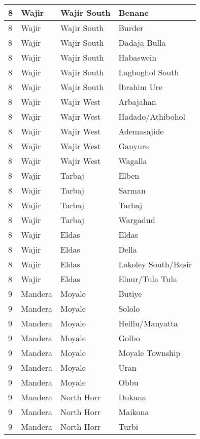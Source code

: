 \begin{table}[!ht]
\begin{tabular}{|l|l|l|l|}
        8 & Wajir & Wajir South & Benane \\ \hline
        8 & Wajir & Wajir South & Burder \\ \hline
        8 & Wajir & Wajir South & Dadaja Bulla \\ \hline
        8 & Wajir & Wajir South & Habaswein \\ \hline
        8 & Wajir & Wajir South & Lagboghol South \\ \hline
        8 & Wajir & Wajir South & Ibrahim Ure \\ \hline
        8 & Wajir & Wajir West & Arbajahan \\ \hline
        8 & Wajir & Wajir West & Hadado/Athibohol \\ \hline
        8 & Wajir & Wajir West & Ademasajide \\ \hline
        8 & Wajir & Wajir West & Ganyure \\ \hline
        8 & Wajir & Wajir West & Wagalla \\ \hline
        8 & Wajir & Tarbaj & Elben \\ \hline
        8 & Wajir & Tarbaj & Sarman \\ \hline
        8 & Wajir & Tarbaj & Tarbaj \\ \hline
        8 & Wajir & Tarbaj & Wargadud \\ \hline
        8 & Wajir & Eldas & Eldas \\ \hline
        8 & Wajir & Eldas & Della \\ \hline
        8 & Wajir & Eldas & Lakoley South/Basir \\ \hline
        8 & Wajir & Eldas & Elnur/Tula Tula \\ \hline
        9 & Mandera & Moyale & Butiye \\ \hline
        9 & Mandera & Moyale & Sololo \\ \hline
        9 & Mandera & Moyale & Heillu/Manyatta \\ \hline
        9 & Mandera & Moyale & Golbo \\ \hline
        9 & Mandera & Moyale & Moyale Township \\ \hline
        9 & Mandera & Moyale & Uran \\ \hline
        9 & Mandera & Moyale & Obbu \\ \hline
        9 & Mandera & North Horr & Dukana \\ \hline
        9 & Mandera & North Horr & Maikona \\ \hline
        9 & Mandera & North Horr & Turbi \\ \hline

\end{tabular}
\end{table}
